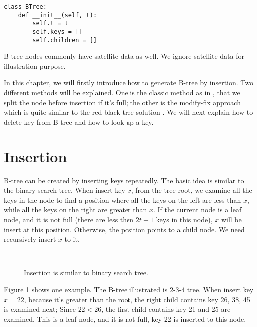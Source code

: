 \documentclass[UTF8]{article}
\begin{document}
\lstset{language=Python}
\begin{lstlisting}
class BTree:
    def __init__(self, t):
        self.t = t
        self.keys = []
        self.children = []
\end{lstlisting}

B-tree nodes commonly have satellite data as well. We ignore
satellite data for illustration purpose.

In this chapter, we will firstly introduce how to generate B-tree by insertion.
Two different methods will be explained. One is the classic method
as in \cite{CLRS}, that we split the node before insertion if it's full;
the other is the modify-fix approach which is quite similar to the
red-black tree solution \cite{okasaki-rbtree} \cite{wiki-b-tree}.
We will next explain how to delete
key from B-tree and how to look up a key.


\section{Insertion}
\label{btree-insertion}

B-tree can be created by inserting
keys repeatedly. The basic idea is similar to the binary
search tree. When insert key $x$, from the tree root, we examine all the
keys in the node to find a position where all the keys on the left are
less than $x$, while all the keys on the right are greater than $x$.
If the current node is a leaf node, and it is not full (there are
less then $2t-1$ keys in this node), $x$ will be insert at this position.
Otherwise, the position points to a child node.
We need recursively insert $x$ to it.

\begin{figure}[htbp]
  \centering
   \\
  \caption{Insertion is similar to binary search tree.} \label{fig:btree-insert-simple}
\end{figure}

Figure \ref{fig:btree-insert-simple} shows one example. The B-tree illustrated
is 2-3-4 tree. When insert key $x=22$, because it's greater than the root,
the right child contains key 26, 38, 45 is examined next; Since $22 < 26$,
the first child contains key 21 and 25 are examined. This is a leaf
node, and it is not full, key 22 is inserted to this node.
\end{document}
